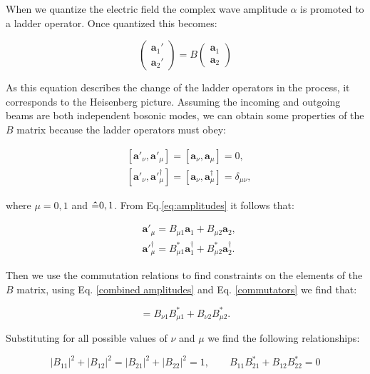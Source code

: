 \documentclass{book}
\begin{document}
When we quantize the electric field the complex wave amplitude $\alpha$ is promoted to a ladder operator. Once quantized this becomes:

\begin{equation}
\begin{pmatrix} \mathbf{a}_{1}' \\ \mathbf{a}_{2}' \end{pmatrix}=B\begin{pmatrix} \mathbf{a}_{1} \\ \mathbf{a}_{2} \end{pmatrix}
\label{eq:amplitudes}
\end{equation}

As this equation describes the change of the ladder operators in the process, it corresponds to the Heisenberg picture. Assuming the incoming and outgoing beams are both independent bosonic modes, we can obtain some properties of the $B$ matrix because the ladder operators must obey:

\begin{align}
&[\mathbf{a}'_{\nu},\mathbf{a}'_{\mu}]=[\mathbf{a}_{\nu},\mathbf{a}_{\mu}]=0,\\
&[\mathbf{a}'_{\nu},\mathbf{a}'^{\dagger}_{\mu}]=[\mathbf{a}_{\nu},\mathbf{a}^{\dagger}_{\mu}]=\delta_{\mu \nu},
\label{commutators}
\end{align}

where $\mu=0,1$ and $\vu=0,1$. From Eq.\ref{eq:amplitudes} it follows that:

\begin{align}
&\mathbf{a}'_{\mu}=B_{\mu 1}\mathbf{a}_{1}+B_{\mu 2} \mathbf{a}_{2}, \\
&\mathbf{a}'^{\dagger}_{\mu}=B_{\mu 1}^{*}\mathbf{a}^{\dagger}_{1}+B_{\mu 2}^{*} \mathbf{a}^{\dagger}_{2}.
\label{combined amplitudes}
\end{align}

Then we use the commutation relations to find constraints on the elements of the $B$ matrix, using Eq. \ref{combined amplitudes} and Eq. \ref{commutators} we find that:

\begin{equation}
   [\mathbf{a}'_{\nu},\mathbf{a}'^{\dagger}_{\mu}]=B_{\nu 1} B_{\mu 1}^{*}+B_{\nu 2} B_{\mu 2}^{*} .
\end{equation}

Substituting for all possible values of $\nu$ and $\mu$ we find the following relationships:

\begin{equation}
|B_{11}|^{2}+|B_{12}|^{2}=|B_{21}|^{2}+|B_{22}|^{2}=1 ,\qquad B_{11} B_{21}^{*}+B_{12} B_{22}^{*}=0
\end{equation}
\end{document}
